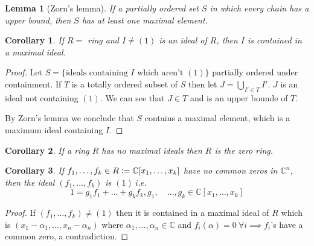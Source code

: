 \documentclass{article}
\newcommand{\C}{\mathbb{C}}
\newcommand{\ie}{\ i.e.\ }
\newcommand{\defeq}{\vcentcolon=}
\newtheorem*{corollary}{Corollary}
\newtheorem*{lemma}{Lemma}
\theoremstyle{definition}
\theoremstyle{remark}
\begin{document}
\begin{lemma}[Zorn's lemma]
    If a partially ordered set $S$ in which every chain has a upper bound, then $S$ has at least one maximal element.
\end{lemma}
\begin{corollary}
    If $R = $ ring and $I \neq (1)$ is an ideal of $R$, then $I$ is contained in a maximal ideal.
\end{corollary}
\begin{proof}
    Let $S = \{\text{ideals containing $I$ which aren't } (1)\}$ partially ordered under containment. If $T$ is a totally ordered subset of $S$ then let $J = \bigcup_{I' \in T} I'$. $J$ is an ideal not containing $(1)$. We can see that $J \in T$ and is an upper bounde of $T$.

    By Zorn's lemma we conclude that $S$ contains a maximal element, which is a maximum ideal containing $I$.
\end{proof}
\begin{corollary}
    If a ring $R$ has no maximal ideals then $R$ is the zero ring.
\end{corollary}
\begin{corollary}
    If $f_1, \ldots, f_k \in R \defeq \C[x_1, \ldots, x_k]$ have no common zeros in $\C^n$, then the ideal $(f_1, \ldots, f_k)$ is $(1) \ie$
    \[
    1 = g_1f_1 + \ldots + g_kf_k, g_1,\quad \ldots, g_k \in \C[x_1, \ldots, x_k]   
    \] 
\end{corollary}
\begin{proof}
    If $(f_1, \ldots, f_k) \neq (1)$ then it is contained in a maximal ideal of $R$ which is $(x_1 - \alpha_1, \ldots, x_n - \alpha_n)$ where $\alpha_1, \ldots, \alpha_n \in \C$ and $f_i(\alpha) = 0\ \forall i \implies f_i$'s have a common zero, a contradiction.
\end{proof}
\end{document}
